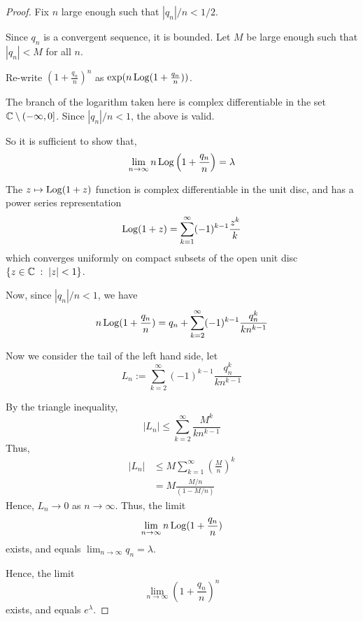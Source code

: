 \documentclass{unswmaths}
\begin{document}
\begin{proof}
    Fix $n$ large enough such that $|q_n|/n < 1/2$.
    
    Since $q_n$ is a convergent sequence, it is bounded. Let $M$
    be large enough such that $|q_n| < M$ for all $n$.
    
    Re-write $\left(1+\frac{q_n}{n}\right)^n$ as $\exp(n\operatorname{Log}(1+\frac{q_n}{n}))$.
    
    The branch of the logarithm taken here is complex differentiable
    in the set $\mathbb{C}\setminus(-\infty,0]$. Since $|q_n|/n < 1$, the above is valid.
    
    So it is sufficient to show that,
    \begin{equation*}
        \lim_{n\rightarrow\infty} n\operatorname{Log}\left(1+\frac{q_n}{n}\right) = \lambda
    \end{equation*}
    
    The $z\mapsto \operatorname{Log}(1+z)$ function is complex differentiable in the unit disc,
    and has a power series representation 
    \begin{equation*}
        \operatorname{Log}(1+z) = \sum_{k=1}^\infty (-1)^{k-1}\frac{z^k}{k}
    \end{equation*}
    which converges uniformly on compact subsets of the open unit disc $\{z\in \mathbb{C}\;:\;|z| < 1\}$.
    
    Now, since $|q_n|/n < 1$, we have
    \begin{equation*}
        n\operatorname{Log}(1+\frac{q_n}{n}) = q_n+\sum_{k=2}^\infty (-1)^{k-1}\frac{q_n^k}{kn^{k-1}}
    \end{equation*}
    
    Now we consider the tail of the left hand side, let
    \begin{equation*}
        L_n := \sum_{k=2}^\infty (-1)^{k-1} \frac{q_n^k}{kn^{k-1}}
    \end{equation*}
    
    By the triangle inequality,
    \begin{equation*}
        |L_n| \leq \sum_{k=2}^\infty \frac{M^k}{kn^{k-1}}
    \end{equation*}
    Thus,
    \begin{align*}
        |L_n| &\leq M\sum_{k=1}^\infty \left(\frac{M}{n}\right)^k\\
        &= M\frac{M/n}{(1-M/n)}
    \end{align*}
    Hence, $L_n\rightarrow 0$ as $n\rightarrow\infty$.
    Thus, the limit
    \begin{equation*}
        \lim_{n\rightarrow\infty} n\operatorname{Log}(1+\frac{q_n}{n})
    \end{equation*}
    exists, and equals $\lim_{n\rightarrow\infty}q_n = \lambda$.
    
    Hence, the limit
    \begin{equation*}
        \lim_{n\rightarrow\infty}\left(1+\frac{q_n}{n}\right)^n
    \end{equation*}
    exists, and equals $e^\lambda$.
\end{proof}
\end{document}
